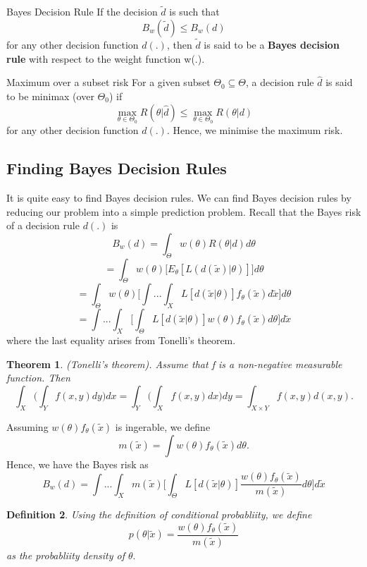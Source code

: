 \documentclass[twoside]{article}
\newcounter{lecnum}
\newtheorem{theorem}{Theorem}[lecnum]
\newtheorem{definition}[theorem]{Definition}
\begin{document}
\begin{definition_exam}{Bayes Decision Rule}{} If the decision $\tilde{d}$ is such that 
$$
B_{w}(\tilde{d}) \leq B_w(d)
$$
for any other decision function $d(.)$, then $\tilde{d}$ is said to be a \textbf{Bayes decision rule} with respect to the weight function w(.).
\end{definition_exam}

\begin{definition_exam}{Maximum over a subset risk}{} For a given subset $\Theta_0 \subseteq \Theta$, a decision rule $\hat{d}$ is said to be minimax (over $\Theta_0$) if 
$$
\max_{\theta \in \Theta_0}R(\theta|\hat{d}) \leq \max_{\theta \in \Theta_0}R(\theta|d)
$$
for any other decision function $d(.)$. Hence, we minimise the maximum risk.
\end{definition_exam}

\subsection{Finding Bayes Decision Rules}
It is quite easy to find Bayes decision rules. We can find Bayes decision rules by reducing our problem into a simple prediction problem. Recall that the Bayes risk of a decision rule $d(.)$ is 
$$
B_w(d) = \int_{\Theta}w(\theta)R(\theta|d)d\theta
$$
$$
= \int_{\Theta}w(\theta)\bigg[E_{\theta}[L(d(\tilde{x})|\theta)] \bigg]d\theta
$$
$$
= \int_{\Theta}w(\theta) \Bigg[ \int ... \int_X L[d(\tilde{x}|\theta)]f_{\theta}(\tilde{x})d\tilde{x} \Bigg] d\theta
$$
$$
= \int ...\int_{X} \Bigg[ \int_{\Theta} L[d(\tilde{x}|\theta)]w(\theta)f_{\theta}(\tilde{x})d\theta\Bigg]d\tilde{x} 
$$
where the last equality arises from Tonelli's theorem.

\begin{theorem}(Tonelli's theorem). Assume that f is a non-negative measurable function. Then 
$$
\int_X\bigg(\int_Yf(x,y)dy \bigg)dx = \int_Y\bigg(\int_Xf(x,y)dx \bigg)dy = \int_{X \times Y}f(x,y)d(x,y).
$$
\end{theorem}

Assuming $w(\theta)f_{\theta}(\tilde{x})$ is ingerable, we define 
$$
m(\tilde{x}) = \int w(\theta)f_{\theta}(\tilde{x})d\theta.
$$
Hence, we have the Bayes risk as 
$$
B_{w}(d)= \int ... \int_{X} m(\tilde{x}) \Bigg[ \int_{\Theta} L[d(\tilde{x}|\theta)]\frac{w(\theta)f_{\theta}(\tilde{x})}{m(\tilde{x})}d\theta\Bigg]d\tilde{x} 
$$

\begin{definition}Using the definition of conditional probabliity, we define 
$$
p(\theta|\tilde{x}) = \frac{w(\theta)f_{\theta}(\tilde{x})}{m(\tilde{x})}
$$
as the probabliity density of $\theta.$
\end{definition}
\end{document}
